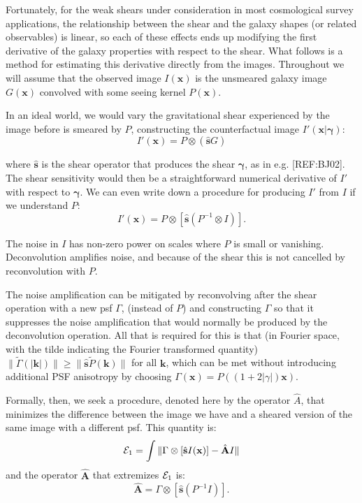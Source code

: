 \documentclass[iop]{emulateapj}
\begin{document}
Fortunately, for the weak shears under consideration in most cosmological survey applications, the relationship between the shear and the galaxy shapes (or related observables) is linear, so each of these effects ends up modifying the first derivative of the galaxy properties with respect to the shear. What follows is a method for estimating this derivative directly from the images. Throughout we will assume that the observed image $I({\mathbf{x}})$ is the unsmeared galaxy image $G(\mathbf{x})$ convolved with some seeing kernel $P(\mathbf{x})$.

In an ideal world, we would vary the gravitational shear experienced by the image before is smeared by $P$, constructing the counterfactual image $I'(\mathbf{x}| {\boldsymbol \gamma})$:
\begin{equation}
  I'({\mathbf{x}}) = P \otimes\left( \hat{\mathbf{s}}G\right)
\end{equation}

where $\hat{\mathbf{s}}$ is the shear operator that produces the shear ${\boldsymbol \gamma}$, as in e.g. [REF:BJ02]. The shear sensitivity would then be a straightforward numerical derivative of $I'$ with respect to ${\boldsymbol \gamma}$. We can even write down a procedure for producing $I'$ from $I$ if we understand $P$:
\begin{equation}
  I'({\mathbf{x}}) = P \otimes \left[ \hat{\mathbf{s}}\left( P^{-1} \otimes I \right)\right].
\end{equation}

The noise in $I$ has non-zero power on scales where $P$ is small or vanishing. Deconvolution amplifies noise, and because of the shear this is not cancelled by reconvolution with $P$. 

The noise amplification can be mitigated by reconvolving after the shear operation with a new psf $\Gamma$, (instead of $P$) and constructing $\Gamma$ so that it suppresses the noise amplification that would normally be produced by the deconvolution operation. All that is required for this is that (in Fourier space, with the tilde indicating the Fourier transformed quantity) $\|\tilde{\Gamma}(\mathbf{|k|}) \| \geq \|\hat{\mathbf{s}} \tilde{P}(\mathbf{k})\|$ for all $\mathbf{k}$, which can be met without introducing additional PSF anisotropy by choosing $\Gamma(\mathbf{x}) = P\left((1+2|\gamma|)\mathbf{x}\right)$.

Formally, then, we seek a procedure, denoted here by the operator $\hat{A}$, that minimizes the difference between the image we have and a sheared version of the same image with a different psf. This quantity is:
\begin{equation}
{\cal E}_1 = \int \| \Gamma \otimes \left[\hat{\mathbf{s}} I(\mathbf{x})\right] - \hat{\mathbf{A}} I \|
\end{equation}
and the operator $\hat{\mathbf{A}} $ that extremizes ${\cal E}_1$ is:
\begin{equation}
\hat{\mathbf{A}}  = \Gamma \otimes \left[ \hat{\mathbf{s}} \left(P^{-1} I \right)\right].
\end{equation}
\end{document}
